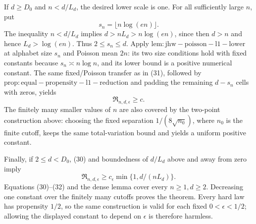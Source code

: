 If \(d\geq D_0\) and \(n<d/L_d\), the desired lower scale is one.  For all sufficiently large \(n\), put
\[
 s_n=\lfloor n\log(en)\rfloor.
\]
The inequality \(n<d/L_d\) implies \(d>nL_d>n\log(en)\), since then \(d>n\) and hence \(L_d>\log(en)\).  Thus \(2\leq s_n\leq d\).  Apply \(\mathrm{lem:jhw-poisson-l1-lower}\) at alphabet size \(s_n\) and Poisson mean \(2n\): its two size conditions hold with fixed constants because \(s_n\asymp n\log n\), and its lower bound is a positive numerical constant.  The same fixed/Poisson transfer as in (31), followed by \(\mathrm{prop:equal-propensity-l1-reduction}\) and padding the remaining \(d-s_n\) cells with zeros, yields
\[
 \mathfrak R_{n,d,\epsilon}\geq c.                                  \tag{32}
\]
The finitely many smaller values of \(n\) are also covered by the two-point construction above: choosing the fixed separation \(1/(8\sqrt{n_0})\), where \(n_0\) is the finite cutoff, keeps the same total-variation bound and yields a uniform positive constant.

Finally, if \(2\leq d<D_0\), (30) and boundedness of \(d/L_d\) above and away from zero imply
\[
 \mathfrak R_{n,d,\epsilon}\geq c_\epsilon\min\{1,d/(nL_d)\}.
\]
Equations (30)--(32) and the dense lemma cover every \(n\geq1,d\geq2\).  Decreasing one constant over the finitely many cutoffs proves the theorem.  Every hard law has propensity \(1/2\), so the same construction is valid for each fixed \(0<\epsilon<1/2\); allowing the displayed constant to depend on \(\epsilon\) is therefore harmless.